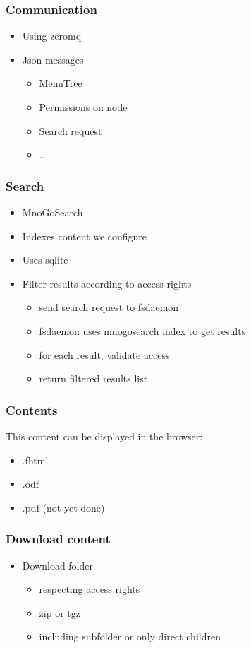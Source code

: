 \documentclass[]{beamer}
\begin{document}
\begin{frame}
\frametitle{Communication}
\begin{itemize}
  \item Using zeromq
  \item Json messages
    \begin{itemize}
      \item MenuTree
      \item Permissions on node
      \item Search request
      \item \ldots
    \end{itemize}
\end{itemize}
\end{frame}

\begin{frame}
\frametitle{Search}
\begin{itemize}
  \item MnoGoSearch
  \item Indexes content we configure
  \item Uses sqlite
  \item Filter results according to access rights
    \begin{itemize}
      \item send search request to fsdaemon
      \item fsdaemon uses mnogosearch index to get results
      \item for each result, validate access
      \item return filtered results list 
    \end{itemize}
\end{itemize}

\end{frame}


\begin{frame}
\frametitle{Contents}
This content can be displayed in the browser:
\begin{itemize}
  \item .fhtml
  \item .odf
  \item .pdf (not yet done)
\end{itemize}
\end{frame}


\begin{frame}
\frametitle{Download content}
\begin{itemize}
  \item Download folder
    \begin{itemize}
      \item respecting access rights
      \item zip or tgz
      \item including subfolder or only direct children
    \end{itemize}
\end{itemize}
\end{frame}
\end{document}
